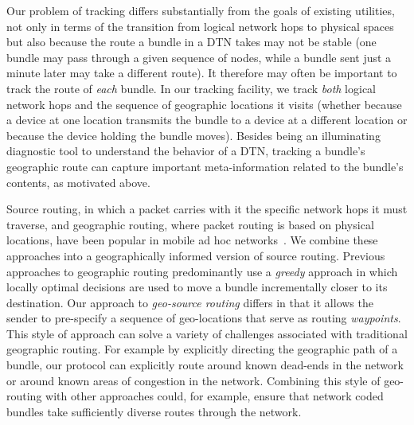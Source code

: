 Our problem of tracking differs substantially from the goals of existing utilities, not only in terms of the transition from logical network hops to physical spaces but also because the route a bundle in a DTN takes may not be stable (one bundle may pass through a given sequence of nodes, while a bundle sent just a minute later may take a different route). It therefore may often be important to track the route of {\em each} bundle. In our tracking facility, we track {\em both} logical network hops and the sequence of geographic locations it visits (whether because a device at one location transmits the bundle to a device at a different location or because the device holding the bundle moves). Besides being an illuminating diagnostic tool to understand the behavior of a DTN, tracking a bundle's geographic route can capture important meta-information related to the bundle's contents, as motivated above. 

Source routing, in which a packet carries with it the specific network hops it must traverse, and geographic routing, where packet routing is based on physical locations, have been popular in mobile ad hoc networks~\cite{johnson96:dynamic, karp00:gpsr}. We combine these approaches into a geographically informed version of source routing. Previous approaches to geographic routing predominantly use a {\em greedy} approach in which locally optimal decisions are used to move a bundle incrementally closer to its destination. Our approach to {\em geo-source routing} differs in that it allows the sender to pre-specify a sequence of geo-locations that serve as routing {\em waypoints}. This style of approach can solve a variety of challenges associated with traditional geographic routing. For example by explicitly directing the geographic path of a bundle, our protocol can explicitly route around known dead-ends in the network or around known areas of congestion in the network. Combining this style of geo-routing with other approaches could, for example, ensure that network coded bundles
take sufficiently diverse routes through the network.


